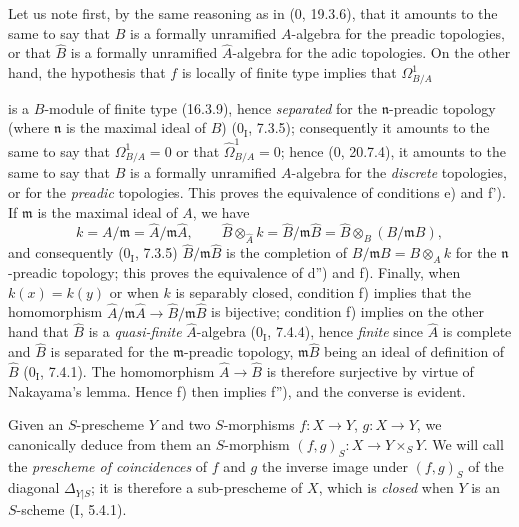 Let us note first, by the same reasoning as in (0, 19.3.6), that it amounts to the same to say that $B$ is a formally unramified $A$-algebra for the preadic topologies, or that $\widehat{B}$ is a formally unramified $\widehat{A}$-algebra for the adic topologies. On the other hand, the hypothesis that $f$ is locally of finite type implies that $\Omega^1_{B/A}$

is a $B$-module of finite type (16.3.9), hence \emph{separated} for the $\mathfrak n$-preadic topology (where $\mathfrak n$ is the maximal ideal of $B$) ($0_{\mathrm I}$, 7.3.5); consequently it amounts to the same to say that $\Omega^1_{B/A}=0$ or that $\widehat{\Omega}^1_{B/A}=0$; hence (0, 20.7.4), it amounts to the same to say that $B$ is a formally unramified $A$-algebra for the \emph{discrete} topologies, or for the \emph{preadic} topologies. This proves the equivalence of conditions e) and f'). If $\mathfrak m$ is the maximal ideal of $A$, we have
\[
k=A/\mathfrak m=\widehat A/\mathfrak m\widehat A,
\qquad
\widehat B\otimes_{\widehat A}k=\widehat B/\mathfrak m\widehat B
=\widehat B\otimes_B(B/\mathfrak m B),
\]
and consequently ($0_{\mathrm I}$, 7.3.5) $\widehat B/\mathfrak m\widehat B$ is the completion of $B/\mathfrak m B=B\otimes_A k$ for the $\mathfrak n$-preadic topology; this proves the equivalence of d'') and f). Finally, when $k(x)=k(y)$ or when $k$ is separably closed, condition f) implies that the homomorphism $\widehat A/\mathfrak m\widehat A\to\widehat B/\mathfrak m\widehat B$ is bijective; condition f) implies on the other hand that $\widehat B$ is a \emph{quasi-finite} $\widehat A$-algebra ($0_{\mathrm I}$, 7.4.4), hence \emph{finite} since $\widehat A$ is complete and $\widehat B$ is separated for the $\mathfrak m$-preadic topology, $\mathfrak m\widehat B$ being an ideal of definition of $\widehat B$ ($0_{\mathrm I}$, 7.4.1). The homomorphism $\widehat A\to\widehat B$ is therefore surjective by virtue of Nakayama's lemma. Hence f) then implies f''), and the converse is evident.

\begin{env}[17.4.5]\label{IV.17.4.5}
Given an $S$-prescheme $Y$ and two $S$-morphisms $f:X\to Y$, $g:X\to Y$, we canonically deduce from them an $S$-morphism $(f,g)_S:X\to Y\times_S Y$. We will call the \emph{prescheme of coincidences} of $f$ and $g$ the inverse image under $(f,g)_S$ of the diagonal $\Delta_{Y|S}$; it is therefore a sub-prescheme of $X$, which is \emph{closed} when $Y$ is an $S$-scheme (I, 5.4.1).
\end{env}

